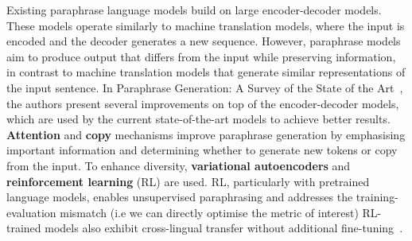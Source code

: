 \documentclass[fleqn,moreauthors,10pt]{ds_report}
\begin{document}
Existing paraphrase language models build on large encoder-decoder models. These models operate similarly to machine translation models, where the input is encoded and the decoder generates a new sequence. However, paraphrase models aim to produce output that differs from the input while preserving information, in contrast to machine translation models that generate similar representations of the input sentence. In {Paraphrase Generation: A Survey of the State of the Art}~\cite{zhou-bhat-2021-paraphrase}, the authors present several improvements on top of the encoder-decoder models, which are used by the current state-of-the-art models to achieve better results. \textbf{Attention} and \textbf{copy} mechanisms improve paraphrase generation by emphasising important information and determining whether to generate new tokens or copy from the input. To enhance diversity, \textbf{variational autoencoders} and \textbf{reinforcement learning} (RL) are used. RL, particularly with pretrained language models, enables unsupervised paraphrasing and addresses the training-evaluation mismatch (i.e we can directly optimise the metric of interest) RL-trained models also exhibit cross-lingual transfer without additional fine-tuning~\cite{DBLP:journals/corr/abs-2010-12885}.

\end{document}
